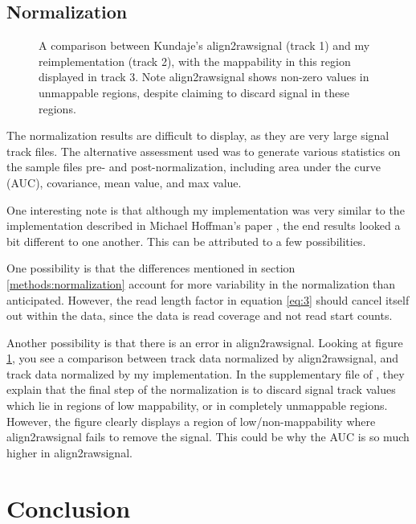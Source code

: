 \documentclass[a4paper]{article}
\begin{document}
    \subsection{Normalization}
    \begin{figure}[htp]

      \caption{A comparison between Kundaje's align2rawsignal (track 1) and my reimplementation (track 2), with the mappability in this region displayed in track 3. Note align2rawsignal shows non-zero values in unmappable regions, despite claiming to discard signal in these regions.}
      \label{fig:2}
    \end{figure}

    The normalization results are difficult to display, as they are very large signal track files. The alternative
    assessment used was to generate various statistics on the sample files pre- and post-normalization, including
    area under the curve (AUC), covariance, mean value, and max value.

    

    One interesting note is that although my implementation
    was very similar to the implementation described in Michael Hoffman's paper \cite{hoffman_integrative_2013}, the
    end results looked a bit different to one another. This can be attributed to a few possibilities.

    One possibility is that the differences mentioned in section \ref{methods:normalization} account for more variability
    in the normalization than anticipated. However, the read length factor in equation \ref{eq:3} should cancel itself out
    within the data, since the data is read coverage and not read start counts.

    Another possibility is that there is an error in align2rawsignal. Looking at figure \ref{fig:2}, you see a comparison
    between track data normalized by align2rawsignal, and track data normalized by my implementation. In the
    supplementary file of \cite{hoffman_integrative_2013}, they explain that the final step of the normalization is to
    discard signal track values which lie in regions of low mappability, or in completely unmappable regions. However,
    the figure clearly displays a region of low/non-mappability where align2rawsignal fails to remove the signal. This
    could be why the AUC is so much higher in align2rawsignal.

  \section{Conclusion}

  {}
  
\end{document}
